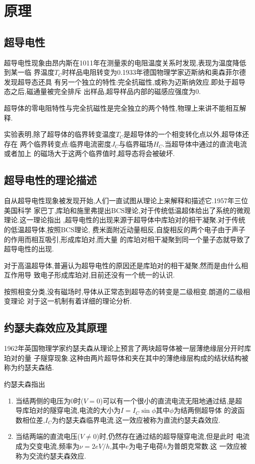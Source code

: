 \documentclass[aps,pre,12pt,preprint,onecolumn,showpacs,showkeys]{revtex4-1}
\begin{document}
\section{原理}

\subsection{超导电性}

超导电性现象由昂内斯在1011年在测量汞的电阻温度关系时发现,表现为温度降低到某一临
界温度$T_C$时样品电阻转变为0.1933年德国物理学家迈斯纳和奥森菲尔德发现超导态还具
有另一个独立的特性:完全抗磁性,或称为迈斯纳效应.即处于超导态之后,磁通量被完全排斥
出样品,超导样品内部的磁感应强度为0.

超导体的零电阻特性与完全抗磁性是完全独立的两个特性,物理上来讲不能相互解释.

实验表明,除了超导体的临界转变温度$T_C$是超导体的一个相变转化点以外,超导体还存在
两个临界转变点:临界电流密度$J_C$与临界磁场$H_C$.当超导体中通过的直流电流或者加上
的磁场大于这两个临界值时,超导态将会被破坏.

\subsection{超导电性的理论描述}

自从超导电性现象被发现开始,人们一直试图从理论上来解释和描述它.1957年三位美国科学
家巴丁,库珀和施里弗提出BCS理论,对于传统低温超体给出了系统的微观理论.这一理论指出
,超导电性的出现来源于超导体中库珀对的相干凝聚.对于传统的低温超导体,按照BCS理论,
费米面附近动量相反,自旋相反的两个电子由于声子的作用而相互吸引,形成库珀对,而大量
的库珀对相干凝聚到同一个量子态就导致了超导电性的出现.

对于高温超导体,普遍认为超导电性的原因还是库珀对的相干凝聚,然而是由什么相互作用导
致电子形成库珀对,目前还没有一个统一的认识.

按照相变分类,没有磁场时,导体从正常态到超导态的转变是二级相变.朗道的二级相变理论
对于这一机制有着详细的理论分析.

\subsection{约瑟夫森效应及其原理}

1962年英国物理学家约瑟夫森从理论上预言了两块超导体被一层薄绝缘层分开时库珀对的量
子隧穿现象.这种由两片超导体和夹在其中的薄绝缘层构成的结状结构被称为约瑟夫森结.

约瑟夫森指出
\begin{enumerate}
    \item 当结两侧的电压为0时($V = 0$)可以有一个很小的直流电流无阻地通过结,是超
        导库珀对的隧穿电流,电流的大小为$I = I_C\sin\phi$其中$\phi$为结两侧超导体
        的波函数相位差,$I_C$为约瑟夫森临界电流.这一效应被称为直流约瑟夫森效应.
    \item 当结两端的直流电压($V \neq 0$)时,仍然存在通过结的超导隧穿电流,但是此时
        电流成为交变电流,频率为$\nu = 2eV/h$,其中$e$为电子电荷$h$为普朗克常数.这
        一效应被称为交流约瑟夫森效应.
\end{enumerate}
\end{document}
